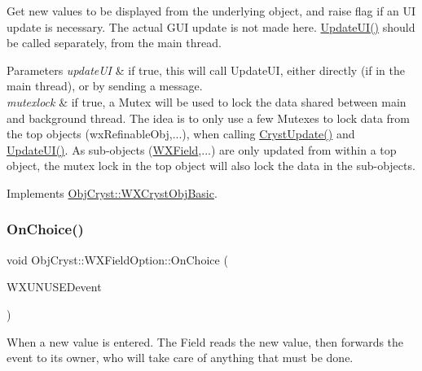 Get new values to be displayed from the underlying object, and raise flag if an UI update is necessary. The actual G\+UI update is not made here. \mbox{\hyperlink{class_obj_cryst_1_1_w_x_field_option_ad0255d70605865c5f54afb20bc3b5c41}{Update\+U\+I()}} should be called separately, from the main thread.


\begin{DoxyParams}{Parameters}
{\em update\+UI} & if true, this will call Update\+UI, either directly (if in the main thread), or by sending a message. \\
\hline
{\em mutexlock} & if true, a Mutex will be used to lock the data shared between main and background thread. The idea is to only use a few Mutexes to lock data from the top objects (wx\+Refinable\+Obj,...), when calling \mbox{\hyperlink{class_obj_cryst_1_1_w_x_field_option_a311178af180f6e17dbf3de43dac50130}{Cryst\+Update()}} and \mbox{\hyperlink{class_obj_cryst_1_1_w_x_field_option_ad0255d70605865c5f54afb20bc3b5c41}{Update\+U\+I()}}. As sub-\/objects (\mbox{\hyperlink{class_obj_cryst_1_1_w_x_field}{W\+X\+Field}},...) are only updated from within a top object, the mutex lock in the top object will also lock the data in the sub-\/objects. \\
\hline
\end{DoxyParams}


Implements \mbox{\hyperlink{class_obj_cryst_1_1_w_x_cryst_obj_basic_a7ac00ae2ae28f1a6fa26e6fa571186b6}{Obj\+Cryst\+::\+W\+X\+Cryst\+Obj\+Basic}}.

\mbox{\label{class_obj_cryst_1_1_w_x_field_option_a3e6b1207ac284497de28a4ede07df048}} 
\subsubsection{\texorpdfstring{OnChoice()}{OnChoice()}}
{\footnotesize\ttfamily void Obj\+Cryst\+::\+W\+X\+Field\+Option\+::\+On\+Choice (\begin{DoxyParamCaption}\item[{wx\+Command\+Event \&}]{W\+X\+U\+N\+U\+S\+EDevent }\end{DoxyParamCaption})}

When a new value is entered. The Field reads the new value, then forwards the event to its owner, who will take care of anything that must be done. \mbox{\label{class_obj_cryst_1_1_w_x_field_option_a8caf4ac439d8c702583ceda0612618ab}} 
